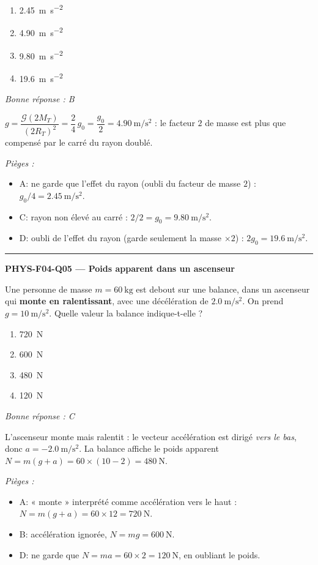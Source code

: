 \documentclass[11pt,a4paper]{article}
\begin{document}
\begin{enumerate}[label=\Alph*)]
\item \qty{2.45}{\metre\per\second\squared}
\item \qty{4.90}{\metre\per\second\squared}
\item \qty{9.80}{\metre\per\second\squared}
\item \qty{19.6}{\metre\per\second\squared}
\end{enumerate}
\textit{Bonne réponse : B}\par
$g=\dfrac{\mathcal{G}(2M_T)}{(2R_T)^2}=\dfrac{2}{4}\,g_0=\dfrac{g_0}{2}=\qty{4.90}{\metre\per\second\squared}$ : le facteur $2$ de masse est plus que compensé par le carré du rayon doublé.\par
\textit{Pièges :}
\begin{itemize}
\item A: ne garde que l'effet du rayon (oubli du facteur de masse $2$) : $g_0/4=\qty{2.45}{\metre\per\second\squared}$.
\item C: rayon non élevé au carré : $2/2=g_0=\qty{9.80}{\metre\per\second\squared}$.
\item D: oubli de l'effet du rayon (garde seulement la masse $\times 2$) : $2g_0=\qty{19.6}{\metre\per\second\squared}$.
\end{itemize}
\vspace{8pt}\hrule\vspace{8pt}
\noindent\textbf{PHYS-F04-Q05 --- Poids apparent dans un ascenseur}\par
Une personne de masse $m=\qty{60}{\kilogram}$ est debout sur une balance, dans un ascenseur qui \textbf{monte en ralentissant}, avec une décélération de $\qty{2.0}{\metre\per\second\squared}$. On prend $g=\qty{10}{\metre\per\second\squared}$. Quelle valeur la balance indique-t-elle ?
\begin{enumerate}[label=\Alph*)]
\item \qty{720}{\newton}
\item \qty{600}{\newton}
\item \qty{480}{\newton}
\item \qty{120}{\newton}
\end{enumerate}
\textit{Bonne réponse : C}\par
L'ascenseur monte mais ralentit : le vecteur accélération est dirigé \emph{vers le bas}, donc $a=\qty{-2.0}{\metre\per\second\squared}$. La balance affiche le poids apparent $N=m(g+a)=60\times(10-2)=\qty{480}{\newton}$.\par
\textit{Pièges :}
\begin{itemize}
\item A: « monte » interprété comme accélération vers le haut : $N=m(g+a)=60\times 12=\qty{720}{\newton}$.
\item B: accélération ignorée, $N=mg=\qty{600}{\newton}$.
\item D: ne garde que $N=ma=60\times 2=\qty{120}{\newton}$, en oubliant le poids.
\end{itemize}
\end{document}

